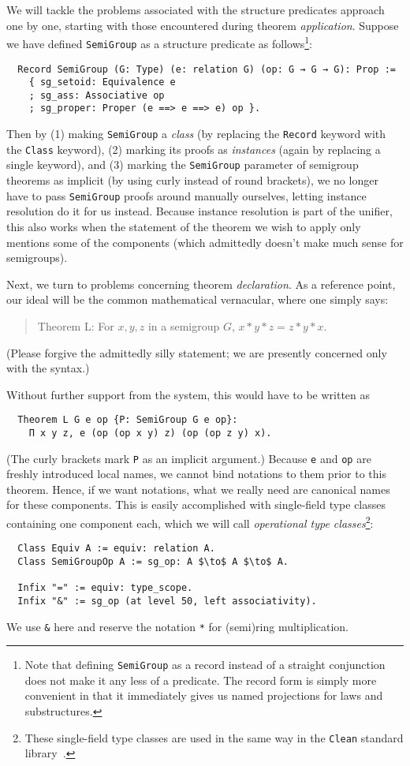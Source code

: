 \documentclass[a4paper,10pt,runningheads]{llncs}
\begin{document}
We will tackle the problems associated with the structure predicates approach one by one, starting with those encountered during theorem \emph{application}. Suppose we have defined \lstinline|SemiGroup| as a structure predicate as follows\footnote{Note that defining \lstinline|SemiGroup| as a record instead of a straight conjunction does not make it any less of a predicate. The record form is simply more convenient in that it immediately gives us named projections for laws and substructures.}:
\begin{lstlisting}
  Record SemiGroup (G: Type) (e: relation G) (op: G → G → G): Prop :=
    { sg_setoid: Equivalence e
    ; sg_ass: Associative op
    ; sg_proper: Proper (e ==> e ==> e) op }.
\end{lstlisting}
Then by (1) making \lstinline|SemiGroup| a \emph{class} (by replacing the \lstinline|Record| keyword with the \lstinline|Class| keyword), (2) marking its proofs as \emph{instances} (again by replacing a single keyword), and (3) marking the \lstinline|SemiGroup| parameter of semigroup theorems as implicit (by using curly instead of round brackets), we no longer have to pass \lstinline|SemiGroup| proofs around manually ourselves, letting instance resolution do it for us instead. Because instance resolution is part of the unifier, this also works when the statement of the theorem we wish to apply only mentions some of the components (which admittedly doesn't make much sense for semigroups).

Next, we turn to problems concerning theorem \emph{declaration}. As a reference point, our ideal will be the common mathematical vernacular, where one simply says:
\begin{quote}
Theorem L: For $x, y, z$ in a semigroup $G$, $x * y * z = z * y * x$.
\end{quote}
(Please forgive the admittedly silly statement; we are presently concerned only with the syntax.)

Without further support from the system, this would have to be written as
\begin{lstlisting}
  Theorem L G e op {P: SemiGroup G e op}:
    Π x y z, e (op (op x y) z) (op (op z y) x).
\end{lstlisting}
(The curly brackets mark \lstinline|P| as an implicit argument.) Because \lstinline|e| and \lstinline{op} are freshly introduced local names, we cannot bind notations to them prior to this theorem. Hence, if we want notations, what we really need are canonical names for these components. This is easily accomplished with single-field type classes containing one component each, which we will call \emph{operational type classes}\footnote{These single-field type classes are used in the same way in the \lstinline|Clean| standard library~\cite{clean}.}:
\begin{lstlisting}
  Class Equiv A := equiv: relation A.
  Class SemiGroupOp A := sg_op: A $\to$ A $\to$ A.

  Infix "=" := equiv: type_scope.
  Infix "&" := sg_op (at level 50, left associativity).
\end{lstlisting}
We use \lstinline|&| here and reserve the notation \lstinline|*| for (semi)ring multiplication.
\end{document}
